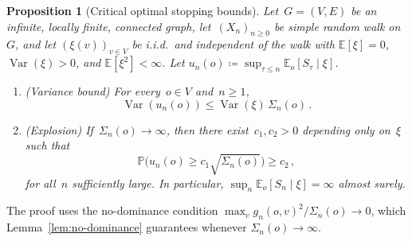 \documentclass[aop]{imsart}
\theoremstyle{plain}
\newtheorem{proposition}[theorem]{Proposition}
\theoremstyle{definition}
\newcommand{\E}{\mathbb{E}}
\renewcommand{\P}{\mathbb{P}}
\DeclareMathOperator{\var}{Var}
\begin{document}
	\begin{proposition}[Critical optimal stopping bounds]\label{prop:critical}
		Let~$G = (V,E)$ be an infinite, locally finite, connected graph, let~$(X_n)_{n\geq 0}$ be simple random walk on~$G$, and let $(\xi(v))_{v\in V}$ be i.i.d.\ and independent of the walk with
		$\E[\xi]=0$, $\var(\xi)>0$, and $\E[\xi^2]<\infty$.
		Let $u_n(o)\coloneqq\sup_{\tau\leq n}\E_o[S_\tau\mid\xi]$.
		
		\begin{enumerate}[label=\textup{(\alph*)}]
			\item \textup{(Variance bound)}\;
			For every~$o\in V$ and~$n\geq 1$,
			\begin{equation}\label{eq:ES-bound}
				\var(u_n(o))\leq\var(\xi)\,\Sigma_n(o)\,.
			\end{equation}
			\item \textup{(Explosion)}\;
			If~$\Sigma_n(o)\to\infty$, then there exist~$c_1,c_2>0$ depending only on~$\xi$ such that
			\begin{equation}\label{eq:PZ-bound}
				\P\bigl(u_n(o)\geq c_1\sqrt{\Sigma_n(o)}\bigr)\geq c_2\,,
			\end{equation}
			for all~$n$ sufficiently large.
			In particular, $\sup_n\E_o[S_n\mid\xi]=\infty$ almost surely.
		\end{enumerate}
	\end{proposition}
	
	The proof uses the no-dominance condition $\max_v g_n(o,v)^2/\Sigma_n(o)\to 0$, which Lemma~\ref{lem:no-dominance} guarantees whenever $\Sigma_n(o)\to\infty$.
	
\end{document}
